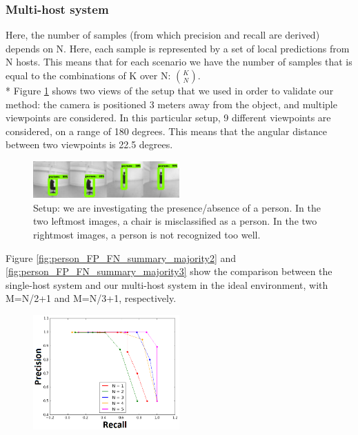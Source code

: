 \documentclass[10pt,conference,compsocconf]{IEEEtran}
\begin{document}
\begin{enumerate}
\subsubsection*{Multi-host system}
\label{sub:multihost}
Here, the number of samples (from which precision and recall are derived) depends on N.
Here, each sample is represented by a set of local predictions from N hosts. This means that for each scenario we have the number of samples that is equal to the combinations of K over N: $\binom{K}{N}$.\\*
Figure \ref{fig:person_FP_FN} shows two views of the setup that we used in order to validate our method: the camera is positioned 3 meters away from the object, and multiple viewpoints are considered. In this particular setup, 9 different viewpoints are considered, on a range of 180 degrees. This means that the angular distance between two viewpoints is 22.5 degrees.
\begin{center}
\begin{figure}
	\captionsetup{type=figure}
	\includegraphics[width=0.5\textwidth]{img/person_FP_FN.png}
	\caption {Setup: we are investigating the presence/absence of a person. In the two leftmost images, a chair is misclassified as a person. In the two rightmost images, a person is not recognized too well.}
	\label{fig:person_FP_FN}
\end{figure}
\end{center}
Figure \ref{fig:person_FP_FN_summary_majority2} and \ref{fig:person_FP_FN_summary_majority3} show the comparison between the single-host system and our multi-host system in the ideal environment, with M=N/2+1 and M=N/3+1, respectively.
\begin{figure}
	\includegraphics[width=0.5\textwidth]{img/summary_majority_HALF_N1_5_CONNECTED.png}

\end{figure}
\end{enumerate}
\end{document}
